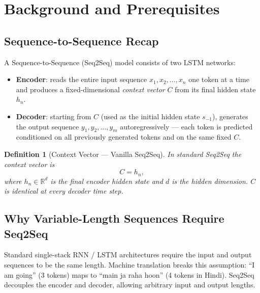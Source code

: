 \documentclass[12pt,a4paper]{article}
\newtheorem{definition}{Definition}[section]
\begin{document}
\section{Background and Prerequisites}
\label{sec:background}

\subsection{Sequence-to-Sequence Recap}

A Sequence-to-Sequence (Seq2Seq) model \cite{sutskever2014} consists
of two LSTM networks:

\begin{itemize}
  \item \textbf{Encoder}: reads the entire input sequence
        $x_1, x_2, \ldots, x_n$ one token at a time and produces a
        fixed-dimensional \emph{context vector} $C$ from its final
        hidden state $h_n$.
  \item \textbf{Decoder}: starting from $C$ (used as the initial
        hidden state $s_{-1}$), generates the output sequence
        $y_1, y_2, \ldots, y_m$ autoregressively --- each token is
        predicted conditioned on all previously generated tokens and
        on the same fixed $C$.
\end{itemize}

\begin{definition}[Context Vector --- Vanilla Seq2Seq]
\label{def:ctx-vanilla}
In standard Seq2Seq the context vector is
\begin{equation}
  C = h_n,
  \label{eq:ctx-vanilla}
\end{equation}
where $h_n \in \mathbb{R}^{d}$ is the final encoder hidden state
and $d$ is the hidden dimension.  $C$ is \emph{identical} at every
decoder time step.
\end{definition}

\subsection{Why Variable-Length Sequences Require Seq2Seq}

Standard single-stack RNN / LSTM architectures require the input and
output sequences to be the same length.  Machine translation breaks
this assumption: ``I am going'' (3 tokens) maps to
``\foreignlanguage{hindi}{main ja raha hoon}'' (4 tokens in Hindi).
Seq2Seq decouples the encoder and decoder, allowing arbitrary input
and output lengths.
\end{document}
